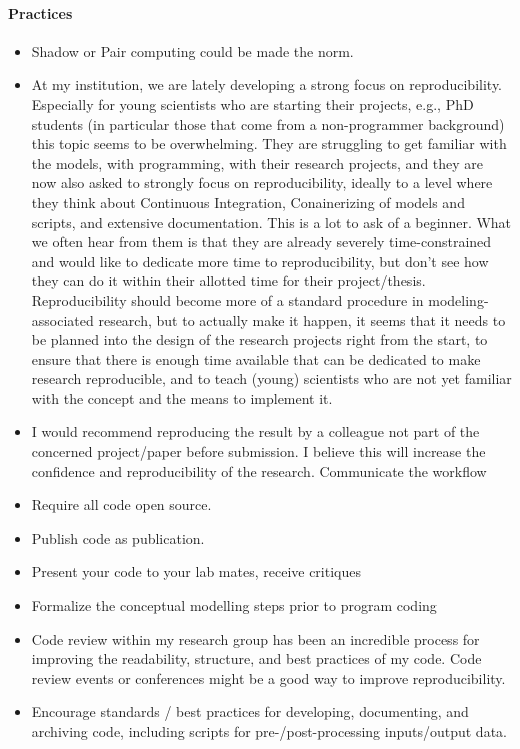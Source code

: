 \documentclass{article}
\begin{document}
\paragraph{Practices}
\begin{itemize}
	\item Shadow or Pair computing could be made the norm.
	\item At my institution, we are lately developing a strong focus on reproducibility. Especially for young scientists who are starting their projects, e.g., PhD students (in particular those that come from a non-programmer background) this topic seems to be overwhelming. They are struggling to get familiar with the models, with programming, with their research projects, and they are now also asked to strongly focus on reproducibility, ideally to a level where they think about Continuous Integration, Conainerizing of models and scripts, and extensive documentation. This is a lot to ask of a beginner. What we often hear from them is that they are already severely time-constrained and would like to dedicate more time to reproducibility, but don't see how they can do it within their allotted time for their project/thesis. Reproducibility should become more of a standard procedure in modeling-associated research, but to actually make it happen, it seems that it needs to be planned into the design of the research projects right from the start, to ensure that there is enough time available that can be dedicated to make research reproducible, and to teach (young) scientists who are not yet familiar with the concept and the means to implement it.
	\item I would recommend reproducing the result by a colleague not part of the concerned project/paper before submission. I believe this will increase the confidence and reproducibility of the research. 
Communicate the workflow
	\item Require all code open source.
	\item Publish code as publication.
	\item Present your code to your lab mates, receive critiques
	\item Formalize the conceptual modelling steps prior to program coding
	\item Code review within my research group has been an incredible process for improving the readability, structure, and best practices of my code. Code review events or conferences might be a good way to improve reproducibility.
	\item Encourage standards / best practices for developing, documenting, and archiving code, including scripts for pre-/post-processing inputs/output data.

\end{itemize}
\end{document}
